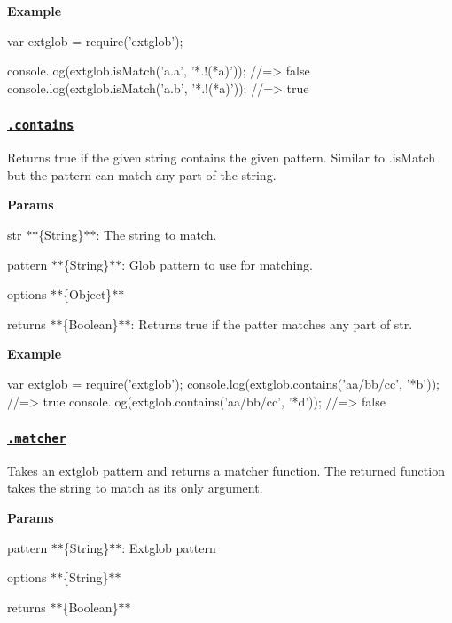 {\bfseries Example}


\begin{DoxyCode}
var extglob = require('extglob');

console.log(extglob.isMatch('a.a', '*.!(*a)'));
//=> false
console.log(extglob.isMatch('a.b', '*.!(*a)'));
//=> true
\end{DoxyCode}


\subsubsection*{\href{index.js#L150}{\tt .contains}}

Returns true if the given {\ttfamily string} contains the given pattern. Similar to {\ttfamily .is\+Match} but the pattern can match any part of the string.

{\bfseries Params}


\begin{DoxyItemize}
\item {\ttfamily str} $\ast$$\ast$\{String\}$\ast$$\ast$\+: The string to match.
\item {\ttfamily pattern} $\ast$$\ast$\{String\}$\ast$$\ast$\+: Glob pattern to use for matching.
\item {\ttfamily options} $\ast$$\ast$\{Object\}$\ast$$\ast$
\item {\ttfamily returns} $\ast$$\ast$\{Boolean\}$\ast$$\ast$\+: Returns true if the patter matches any part of {\ttfamily str}.
\end{DoxyItemize}

{\bfseries Example}


\begin{DoxyCode}
var extglob = require('extglob');
console.log(extglob.contains('aa/bb/cc', '*b'));
//=> true
console.log(extglob.contains('aa/bb/cc', '*d'));
//=> false
\end{DoxyCode}


\subsubsection*{\href{index.js#L184}{\tt .matcher}}

Takes an extglob pattern and returns a matcher function. The returned function takes the string to match as its only argument.

{\bfseries Params}


\begin{DoxyItemize}
\item {\ttfamily pattern} $\ast$$\ast$\{String\}$\ast$$\ast$\+: Extglob pattern
\item {\ttfamily options} $\ast$$\ast$\{String\}$\ast$$\ast$
\item {\ttfamily returns} $\ast$$\ast$\{Boolean\}$\ast$$\ast$
\end{DoxyItemize}


